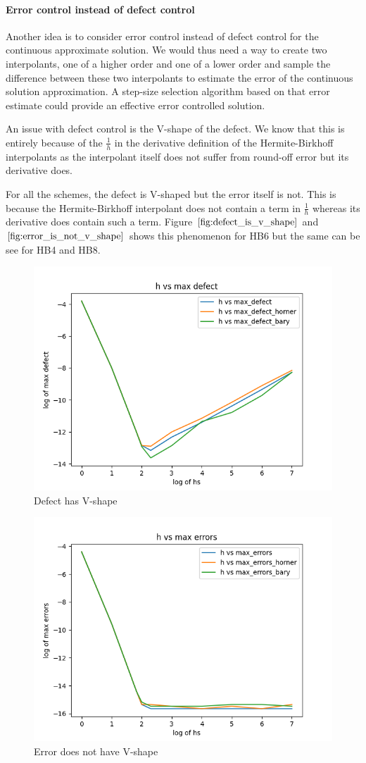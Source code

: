 \documentclass{report}
\begin{document}
\paragraph{Error control instead of defect control}
Another idea is to consider error control instead of defect control for the continuous approximate solution. We would thus need a way to create two interpolants, one of a higher order and one of a lower order and sample the difference between these two interpolants to estimate the error of the continuous solution approximation. A step-size selection algorithm based on that error estimate could provide an effective error controlled solution.

An issue with defect control is the V-shape of the defect. We know that this is entirely because of the $\frac{1}{h}$ in the derivative definition of the Hermite-Birkhoff interpolants as the interpolant itself does not suffer from round-off error but its derivative does.

For all the schemes, the defect is V-shaped but the error itself is not. This is because the Hermite-Birkhoff interpolant does not contain a term in $\frac{1}{h}$ whereas its derivative does contain such a term. Figure $\ref{fig:defect_is_v_shape}$ and $\ref{fig:error_is_not_v_shape}$ shows this phenomenon for HB6 but the same can be see for HB4 and HB8. 

\begin{figure}[H]
\centering
\includegraphics[width=0.7\linewidth]{./figures/further_work_defect_is_v_shape_hb6}
\caption{Defect has V-shape}
\label{fig:defect_is_v_shape}
\end{figure}

\begin{figure}[H]
\centering
\includegraphics[width=0.7\linewidth]{./figures/further_work_error_is_not_v_shape_hb6}
\caption{Error does not have V-shape}
\label{fig:error_is_not_v_shape}
\end{figure}
\end{document}
